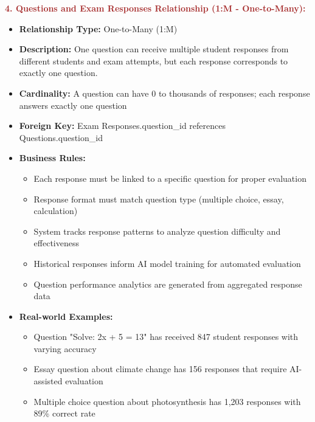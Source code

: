 \documentclass[12pt,a4paper,oneside]{book}
\begin{document}
\textbf{\textcolor{brown}{4. Questions and Exam Responses Relationship (1:M - One-to-Many):}}
\begin{itemize}
    \item \textbf{Relationship Type:} One-to-Many (1:M)
    \item \textbf{Description:} One question can receive multiple student responses from different students and exam attempts, but each response corresponds to exactly one question.
    \item \textbf{Cardinality:} A question can have 0 to thousands of responses; each response answers exactly one question
    \item \textbf{Foreign Key:} Exam Responses.question\_id references Questions.question\_id
    \item \textbf{Business Rules:}
        \begin{itemize}
            \item Each response must be linked to a specific question for proper evaluation
            \item Response format must match question type (multiple choice, essay, calculation)
            \item System tracks response patterns to analyze question difficulty and effectiveness
            \item Historical responses inform AI model training for automated evaluation
            \item Question performance analytics are generated from aggregated response data
        \end{itemize}
    \item \textbf{Real-world Examples:}
        \begin{itemize}
            \item Question "Solve: 2x + 5 = 13" has received 847 student responses with varying accuracy
            \item Essay question about climate change has 156 responses that require AI-assisted evaluation
            \item Multiple choice question about photosynthesis has 1,203 responses with 89\% correct rate
        \end{itemize}
\end{itemize}
\end{document}
